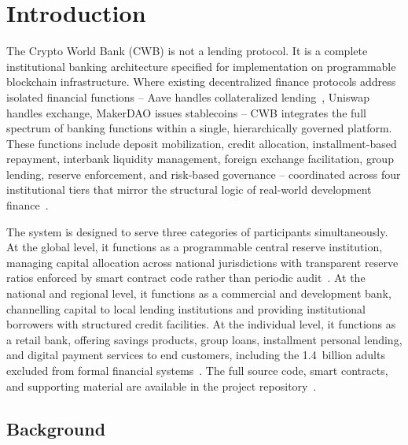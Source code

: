 \documentclass[12pt,a4paper]{report}
\begin{document}

\chapter{Introduction}
\label{ch:intro}

The Crypto World Bank (CWB) is not a lending protocol. It is a complete institutional banking architecture specified for implementation on programmable blockchain infrastructure. Where existing decentralized finance protocols address isolated financial functions -- Aave handles collateralized lending~\cite{aaveTechpaper2022}, Uniswap handles exchange, MakerDAO issues stablecoins -- CWB integrates the full spectrum of banking functions within a single, hierarchically governed platform. These functions include deposit mobilization, credit allocation, installment-based repayment, interbank liquidity management, foreign exchange facilitation, group lending, reserve enforcement, and risk-based governance -- coordinated across four institutional tiers that mirror the structural logic of real-world development finance~\cite{ocampo2024mdbs}.

The system is designed to serve three categories of participants simultaneously. At the global level, it functions as a programmable central reserve institution, managing capital allocation across national jurisdictions with transparent reserve ratios enforced by smart contract code rather than periodic audit~\cite{werner2022sokDefi}. At the national and regional level, it functions as a commercial and development bank, channelling capital to local lending institutions and providing institutional borrowers with structured credit facilities. At the individual level, it functions as a retail bank, offering savings products, group loans, installment personal lending, and digital payment services to end customers, including the 1.4~billion adults excluded from formal financial systems~\cite{findex2021}. The full source code, smart contracts, and supporting material are available in the project repository~\cite{cwbRepo2026}.

\section{Background}
\label{sec:background}
\end{document}
